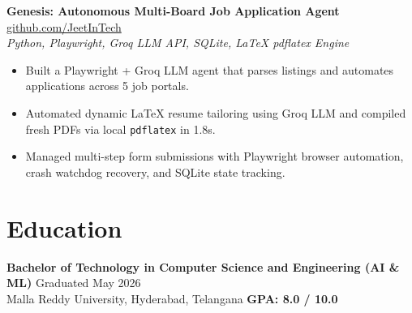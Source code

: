 \documentclass[10pt]{article}
\newcommand{\educationSection}{
\section*{Education}
\textbf{Bachelor of Technology in Computer Science and Engineering (AI \& ML)} \hfill Graduated May 2026 \\
Malla Reddy University, Hyderabad, Telangana \hfill \textbf{GPA: 8.0 / 10.0}
}
\begin{document}
\vspace{1.5pt}
\textbf{Genesis: Autonomous Multi-Board Job Application Agent} \hfill \href{https://github.com/JeetInTech}{github.com/JeetInTech} \\
\textit{Python, Playwright, Groq LLM API, SQLite, LaTeX pdflatex Engine}
\begin{itemize}
    \item Built a Playwright + Groq LLM agent that parses listings and automates applications across 5 job portals.
    \item Automated dynamic LaTeX resume tailoring using Groq LLM and compiled fresh PDFs via local \texttt{pdflatex} in 1.8s.
    \item Managed multi-step form submissions with Playwright browser automation, crash watchdog recovery, and SQLite state tracking.
\end{itemize}

\educationSection
\end{document}
